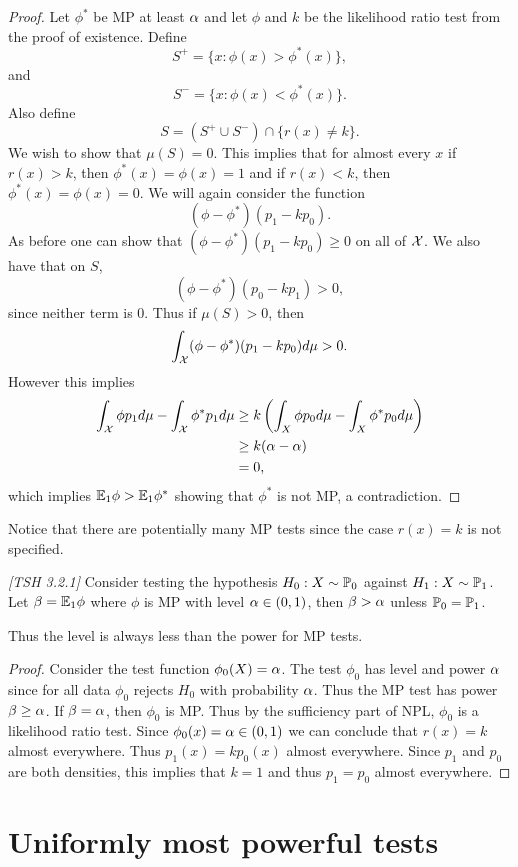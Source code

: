 \begin{proof}
    Let $\phi^*$ be MP at least ${\alpha}$ and let $\phi$ and $k$ be the likelihood ratio test from the proof of existence. Define
    \[S^+ = \{x : \phi(x)> \phi^*(x)\}, \]
    and
    \[S^- = \{x : \phi(x) < \phi^*(x)\}.\]
    Also define 
    \[S = (S^+\cup S^-) \cap \{r(x)\neq k\}. \]
    We wish to show that $\mu(S) =0$. This implies that for almost every $x$ if $r(x) > k$, then $\phi^*(x)=\phi(x)=1$ and if $r(x)<k$, then $\phi^*(x)=\phi(x)=0$. We will again consider the function 
    \[(\phi-\phi^*)(p_1-kp_0). \]
    As before one can show that $(\phi-\phi^*)(p_1-kp_0) \ge 0$ on all of ${\mathcal{X}}$. We also have that on $S$, 
    \[(\phi-\phi^*)(p_0-kp_1)>0, \]
    since neither term is 0. Thus if $\mu(S) > 0$, then 
    \[\int_{\mathcal{X}}(\phi-\phi^*)(p_1-kp_0)d\mu > 0. \]
    However this implies 
    \begin{align*}
        \int_{\mathcal{X}} \phi p_1d\mu -\int_{\mathcal{X}} \phi^* p_1d\mu&\ge k \left(\int_X \phi p_0d\mu - \int_X \phi^* p_0d\mu\right) \\
        &\ge k({\alpha}-{\alpha})\\
        &=0,
    \end{align*}
    which implies ${\mathbb{E}}_1 \phi > {\mathbb{E}}_1 \phi^*$ showing that $\phi^*$ is not MP, a contradiction.
\end{proof}
Notice that there are potentially many MP tests since the case $r(x)=k$ is not specified. 
\begin{cor}
    \emph{[TSH 3.2.1]} Consider testing the hypothesis $H_0 : X\sim {\mathbb{P}}_0$ against $H_1 : X\sim {\mathbb{P}}_1$. Let $\beta = {\mathbb{E}}_1 \phi$ where $\phi$ is MP with level ${\alpha} \in (0,1)$, then $\beta > {\alpha}$ unless ${\mathbb{P}}_0 ={\mathbb{P}}_1$.
\end{cor}
Thus the level is always less than the power for MP tests.
\begin{proof}
    Consider the test function $\phi_0(X) = {\alpha}$. The test $\phi_0$ has level and power ${\alpha}$ since for all data $\phi_0$ rejects $H_0$ with probability ${\alpha}$. Thus the MP test has power $\beta \ge {\alpha}$. If $\beta = {\alpha}$, then $\phi_0$ is MP. Thus by the sufficiency part of NPL, $\phi_0$ is a likelihood ratio test. Since $\phi_0(x) = {\alpha} \in (0,1)$ we can conclude that $r(x) = k$ almost everywhere. Thus $p_1(x) = kp_0(x)$ almost everywhere. Since $p_1$ and $p_0$ are both densities, this implies that $k=1$ and thus $p_1=p_0$ almost everywhere.
\end{proof}
\section{Uniformly most powerful tests}

